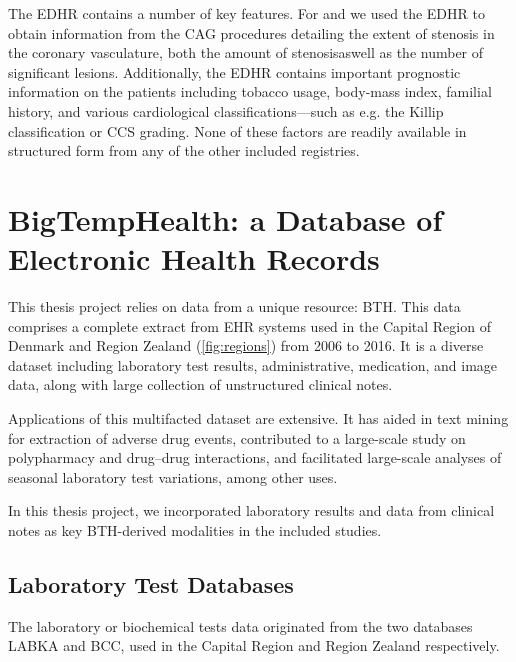 The \ac{EDHR} contains a number of key features.
For \studyii{} and \studyiii{} we used the \ac{EDHR} to 
obtain information from the \ac{CAG} procedures 
detailing the extent of stenosis in the coronary vasculature, 
both the amount of stenosis\footnotemark aswell 
as the number of significant lesions.
Additionally, the \ac{EDHR} contains important prognostic information 
on the patients including tobacco usage, body-mass index, familial history,
and various cardiological classifications---such as e.g. the 
Killip classification
or \ac{CCS} grading.
None of these factors are readily available in structured form from
any of the other included registries.


\section{BigTempHealth: a Database of Electronic Health Records}

This thesis project relies on data from a unique resource: \ac{BTH}. 
This data comprises a complete extract from \ac{EHR} systems used in
the Capital Region of Denmark and Region Zealand (\cref{fig:regions})
from 2006 to 2016.  
It is a diverse dataset including
laboratory test results, administrative, medication, and image data,
along with large collection of unstructured clinical notes.  

Applications of this multifacted dataset are extensive.
It has aided in 
text mining for extraction of adverse drug events,
contributed to a large-scale study on polypharmacy and drug--drug interactions,
\autocite{rodriguezDrug2023}
and facilitated large-scale analyses of seasonal laboratory test variations,
\autocite{musePopulationwide2023} 
among other uses.

In this thesis project, we incorporated laboratory results 
and data from clinical notes as key \ac{BTH}-derived modalities 
in the included studies.


\subsection{Laboratory Test Databases}

The laboratory or biochemical tests data originated from the two databases
\ac{LABKA} and \ac{BCC}, used in the Capital Region and Region Zealand
respectively.

